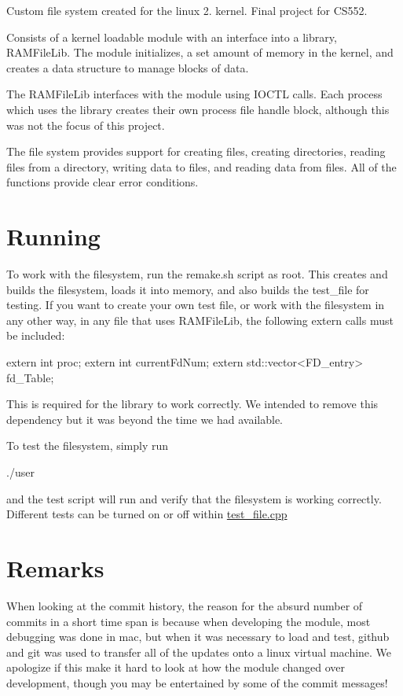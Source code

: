 Custom file system created for the linux 2. kernel. Final project for C\-S552.

Consists of a kernel loadable module with an interface into a library, R\-A\-M\-File\-Lib. The module initializes, a set amount of memory in the kernel, and creates a data structure to manage blocks of data.

The R\-A\-M\-File\-Lib interfaces with the module using I\-O\-C\-T\-L calls. Each process which uses the library creates their own process file handle block, although this was not the focus of this project.

The file system provides support for creating files, creating directories, reading files from a directory, writing data to files, and reading data from files. All of the functions provide clear error conditions.

\section*{Running}

To work with the filesystem, run the remake.\-sh script as root. This creates and builds the filesystem, loads it into memory, and also builds the test\-\_\-file for testing. If you want to create your own test file, or work with the filesystem in any other way, in any file that uses R\-A\-M\-File\-Lib, the following extern calls must be included\-: \begin{DoxyVerb}extern int proc;
extern int currentFdNum;
extern std::vector<FD_entry> fd_Table;
\end{DoxyVerb}


This is required for the library to work correctly. We intended to remove this dependency but it was beyond the time we had available.

To test the filesystem, simply run \begin{DoxyVerb}./user
\end{DoxyVerb}


and the test script will run and verify that the filesystem is working correctly. Different tests can be turned on or off within \hyperlink{test__file_8cpp}{test\-\_\-file.\-cpp}

\section*{Remarks}

When looking at the commit history, the reason for the absurd number of commits in a short time span is because when developing the module, most debugging was done in mac, but when it was necessary to load and test, github and git was used to transfer all of the updates onto a linux virtual machine. We apologize if this make it hard to look at how the module changed over development, though you may be entertained by some of the commit messages! 